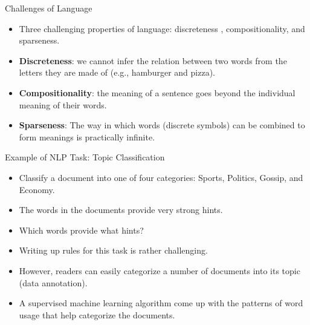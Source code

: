 \documentclass[handout]{beamer}
\begin{document}
\begin{frame}{Challenges of Language}
\begin{scriptsize}
\begin{itemize}
\item Three challenging properties of language: discreteness , compositionality, and sparseness.
\item \textbf{Discreteness}: we cannot infer the relation between two words from the letters they are made of (e.g., hamburger and pizza). 
\item \textbf{Compositionality}: the meaning of a sentence goes beyond the individual meaning of their words. 
\item \textbf{Sparseness}: The way in which words
(discrete symbols) can be combined to form meanings is practically infinite.
\end{itemize}
\end{scriptsize}
\end{frame}










\begin{frame}{Example of NLP Task: Topic Classification}
\begin{scriptsize}
\begin{itemize}
\item Classify a document into one of four categories: Sports, Politics, Gossip, and Economy. 
\item The words in the documents provide very strong hints.
\item Which words provide what hints? 
\item Writing up rules for this task is rather challenging. 
\item However, readers can easily categorize a number of documents into its topic (data annotation).
\item A supervised machine learning algorithm come up with the patterns of word usage that help categorize the documents.
\end{itemize}
\end{scriptsize}
\end{frame}
\end{document}
